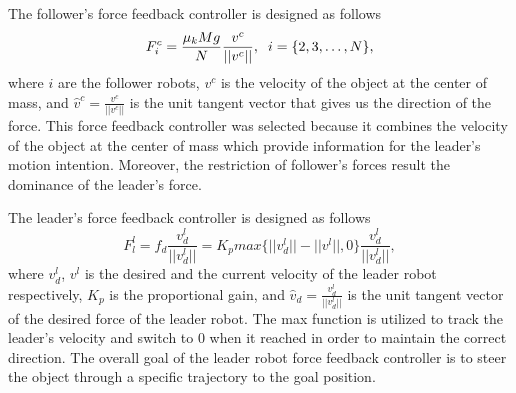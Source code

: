 \documentclass[letterpaper, 10 pt, conference]{ieeeconf}
\begin{document}
The follower's force feedback controller is designed as follows
\begin{equation}\label{cbfc}
F_i^c=\frac{\mu_k Mg}{N}\frac{v^c}{||v^c||}, \hspace{.2cm} i=\{ 2,3,\hdots , N\},
\end{equation}
where $i$ are the follower robots, $v^c$ is the velocity of the object at the center of mass, and $\hat{v}^c=\frac{v^c}{||v^c||}$ is the unit tangent vector that gives us the direction of the force. This force feedback controller was selected because it combines the velocity of the object at the center of mass which provide information for the leader's motion intention. Moreover, the restriction of follower's forces result the dominance  of the leader's force.

The leader's force feedback controller is designed as follows
\begin{equation}\label{cblc}
F_l^l= f_d \frac{v_d^l}{||v_d^l||}= K_pmax\{ ||v_d^l||-||v^l||,0 \}\frac{v_d^l}{||v_d^l||},
\end{equation}
where $v_d^l$, $v^l$ is the desired and the current velocity of the leader robot respectively, $K_p$ is the proportional gain, and $\hat{v}_d=\frac{v_d^l}{||v_d^l||}$ is the unit tangent vector of the desired force of the leader robot. The max function is utilized to track the leader's velocity and switch to $0$ when it reached in order to maintain the correct direction. The overall goal of the leader robot force feedback controller is to steer the object through a specific trajectory to the goal position.
\end{document}
